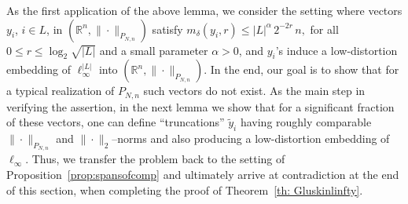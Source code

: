 \documentclass[11pt]{amsart}
\theoremstyle{definition}
\theoremstyle{plain}
\newcommand{\R}{\mathbb{R}}
\def\R{{\mathbb R}}
\begin{document}
As the first application of the above lemma,
we consider the setting where vectors $y_i$, $i\in L$, in $(\R^n,\|\cdot\|_{P_{N,n}})$
satisfy
$
m_\delta(y_i,r)\leq |L|^{\alpha}\,2^{-2r}\,n,
$
for all $0\leq r\leq \log_2 \sqrt{|L|}$ and a small parameter $\alpha>0$,
and $y_i$'s induce a low-distortion embedding of $\ell_\infty^{|L|}$
into $(\R^n,\|\cdot\|_{P_{N,n}})$.
In the end, our goal is to show that for a typical realization of $P_{N,n}$
such vectors do not exist.
As the main step in verifying the assertion, in the next lemma we show
that for a significant
fraction of these vectors, one can define ``truncations'' $\tilde y_i$
having roughly comparable $\|\cdot\|_{P_{N,n}}$ and $\|\cdot\|_2$--norms
and also producing a low-distortion embedding of $\ell_\infty$.
Thus, we transfer the problem back to the setting of Proposition~\ref{prop:spansofcomp}
and ultimately arrive at contradiction at the end of this section, when completing
the proof of Theorem~\ref{th: Gluskinlinfty}.
\end{document}
